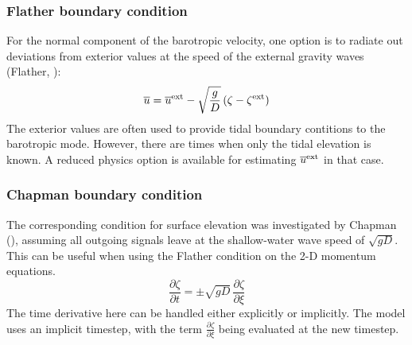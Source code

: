 \subsubsection{Flather boundary condition}
For the normal component of the barotropic velocity, one option is
to radiate out deviations from exterior values at the speed of the external
gravity waves (Flather, \cite{Flather76}):
\begin{equation}
  \overline{u} = \overline{u}^{\rm ext} - \sqrt{\frac{g}{D}} \,
  (\zeta - \zeta^{\rm ext})
\end{equation}
The exterior values are often used to provide tidal
boundary contitions to the barotropic mode. However, there are times
when only the tidal elevation is known. A reduced physics option
is available for estimating $\overline{u}^{\rm ext}$ in that case.

\subsubsection{Chapman boundary condition}
The corresponding condition for surface elevation was investigated
by Chapman (\cite{Chapman85}), assuming all outgoing signals leave
at the shallow-water wave speed of $\sqrt{gD}$. This can be useful
when using the Flather condition on the 2-D momentum equations.
\begin{equation}
  \frac{\partial \zeta}{\partial t} = \pm \sqrt{gD} \,
  \frac{\partial \zeta}{\partial \xi}
\end{equation}
The time derivative here can be handled either explicitly or
implicitly. The model uses an implicit timestep, with the term
$\frac{\partial \zeta}{\partial \xi}$ being evaluated at the new
timestep.

